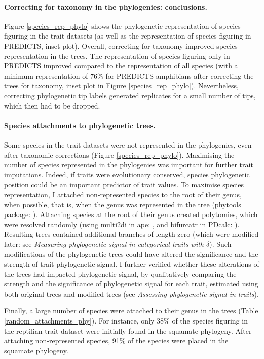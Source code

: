 \paragraph{Correcting for taxonomy in the phylogenies: conclusions.}
Figure \ref{species_rep_phylo} shows the phylogenetic representation of species figuring in the trait datasets (as well as the representation of species figuring in PREDICTS, inset plot). Overall, correcting for taxonomy improved species representation in the trees. The representation of species figuring only in PREDICTS improved compared to the representation of all species (with a minimum representation of 76\% for PREDICTS amphibians after correcting the trees for taxonomy, inset plot in Figure \ref{species_rep_phylo}). Nevertheless, correcting phylogenetic tip labels generated replicates for a small number of tips, which then had to be dropped. 


\paragraph{Species attachments to phylogenetic trees.} Some species in the trait datasets were not represented in the phylogenies, even after taxonomic corrections (Figure \ref{species_rep_phylo}). Maximising the number of species represented in the phylogenies was important for further trait imputations. Indeed, if traits were evolutionary conserved, species phylogenetic position could be an important predictor of trait values. To maximise species representation, I attached non-represented species to the root of their genus, when possible, that is, when the genus was represented in the tree (phytools package: \citet{Revell2016}). Attaching species at the root of their genus created polytomies, which were resolved randomly (using multi2di in ape: \citet{ape},  and bifurcatr in PDcalc: \citet{PDcalc}). Resulting trees contained additional branches of length zero (which were modified later: see \textit{Measuring phylogenetic signal in categorical traits with $\delta$}). Such modifications of the phylogenetic trees could have altered the significance and the strength of trait phylogenetic signal. I further verified whether these alterations of the trees had impacted phylogenetic signal, by qualitatively comparing the strength and the significance of phylogenetic signal for each trait, estimated using both original trees and modified trees (see \textit{Assessing phylogenetic signal in traits}).

Finally, a large number of species were attached to their genus in the trees (Table \ref{random_attachments_phy}). For instance, only 38\% of the species figuring in the reptilian trait dataset were initially found in the squamate phylogeny. After attaching non-represented species, 91\% of the species were placed in the squamate phylogeny. 

